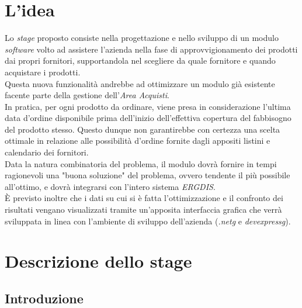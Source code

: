 \section{L'idea}
\noindent Lo \textit{stage} proposto consiste nella progettazione e nello sviluppo di un modulo \textit{software} volto
ad assistere l'azienda nella fase di approvvigionamento dei prodotti dai propri fornitori, supportandola nel scegliere
da quale fornitore e quando acquistare i prodotti.\\

\noindent Questa nuova funzionalità andrebbe ad ottimizzare un modulo già esistente facente parte della
gestione dell'\textit{Area Acquisti}.\\
In pratica, per ogni prodotto da ordinare, viene presa in considerazione l'ultima data d'ordine disponibile prima dell'inizio
dell'effettiva copertura del fabbisogno del prodotto stesso. Questo dunque non garantirebbe con certezza una scelta ottimale
in relazione alle possibilità d'ordine fornite dagli appositi listini e calendario dei fornitori.\\

\noindent Data la natura combinatoria del problema, il modulo dovrà fornire in tempi ragionevoli una "buona soluzione"
del problema, ovvero tendente il più possibile all'ottimo, e dovrà integrarsi con l'intero sistema \textit{ERGDIS}.\\

\noindent È previsto inoltre che i dati su cui si è fatta l'ottimizzazione e il confronto dei risultati vengano visualizzati tramite un'apposita
interfaccia grafica che verrà sviluppata in linea con l'ambiente di sviluppo dell'azienda (\textit{\gls{.netg}} e \textit{\gls{devexpressg}}).


\section{Descrizione dello stage}

\subsection{Introduzione}

